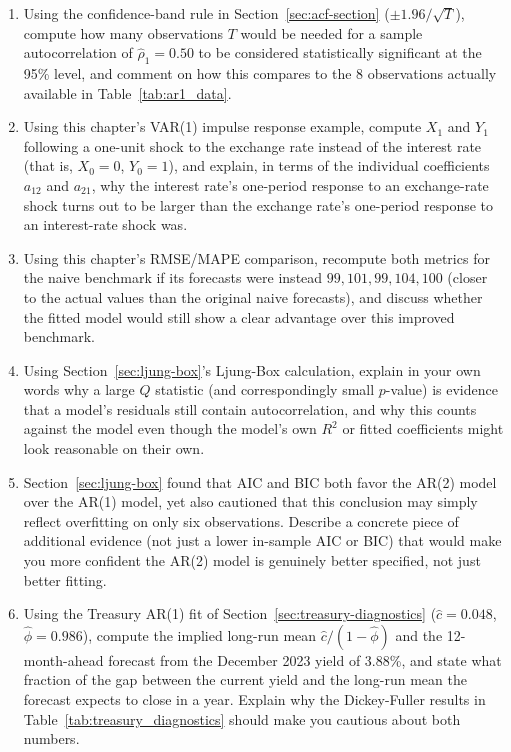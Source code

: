 \documentclass[../ai_in_finance]{subfiles}
\begin{document}
\begin{enumerate}[exercises]
    \item Using the confidence-band rule in Section~\ref{sec:acf-section} ($\pm 1.96/\sqrt{T}$), compute how many observations $T$ would be needed for a sample autocorrelation of $\hat\rho_1=0.50$ to be considered statistically significant at the 95\% level, and comment on how this compares to the 8 observations actually available in Table~\ref{tab:ar1_data}.
    \item Using this chapter's VAR(1) impulse response example, compute $X_1$ and $Y_1$ following a one-unit shock to the exchange rate instead of the interest rate (that is, $X_0=0$, $Y_0=1$), and explain, in terms of the individual coefficients $a_{12}$ and $a_{21}$, why the interest rate's one-period response to an exchange-rate shock turns out to be larger than the exchange rate's one-period response to an interest-rate shock was.
    \item Using this chapter's RMSE/MAPE comparison, recompute both metrics for the naive benchmark if its forecasts were instead $99, 101, 99, 104, 100$ (closer to the actual values than the original naive forecasts), and discuss whether the fitted model would still show a clear advantage over this improved benchmark.
    \item Using Section~\ref{sec:ljung-box}'s Ljung-Box calculation, explain in your own words why a large $Q$ statistic (and correspondingly small $p$-value) is evidence that a model's residuals still contain autocorrelation, and why this counts against the model even though the model's own $R^2$ or fitted coefficients might look reasonable on their own.
    \item Section~\ref{sec:ljung-box} found that AIC and BIC both favor the AR(2) model over the AR(1) model, yet also cautioned that this conclusion may simply reflect overfitting on only six observations. Describe a concrete piece of additional evidence (not just a lower in-sample AIC or BIC) that would make you more confident the AR(2) model is genuinely better specified, not just better fitting.
    \item Using the Treasury AR(1) fit of Section~\ref{sec:treasury-diagnostics} ($\hat c = 0.048$, $\hat\phi = 0.986$), compute the implied long-run mean $\hat c/(1-\hat\phi)$ and the 12-month-ahead forecast from the December 2023 yield of 3.88\%, and state what fraction of the gap between the current yield and the long-run mean the forecast expects to close in a year. Explain why the Dickey-Fuller results in Table~\ref{tab:treasury_diagnostics} should make you cautious about both numbers.

\end{enumerate}
\end{document}
